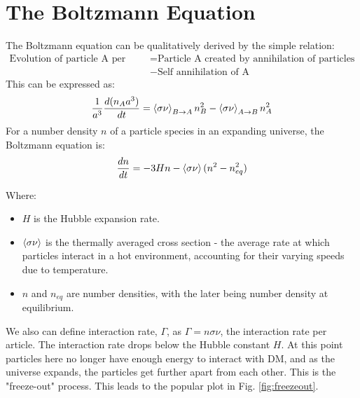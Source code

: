 \documentclass[12pt]{article}
\begin{document}
\section{The Boltzmann Equation}
\label{sec:boltzmann}
The Boltzmann equation can be qualitatively derived by the simple relation:
\begin{equation}
    \begin{split}
            \text{Evolution of particle A per unit volume} &= \text{Particle A created by annihilation of particles in the bath B} 
            \\&- \text{Self annihilation of A}
    \end{split}
\end{equation}
This can be expressed as:
\begin{equation}
    \begin{split}
        \frac{1}{a^3}\frac{d(n_Aa^3)}{dt} = \braket{\sigma \nu}_{B \rightarrow A} n^2_B- \braket{\sigma \nu}_{A \rightarrow B}n^2_A
    \end{split}
\end{equation}
For a number density $n$ of a particle species in an expanding universe, the Boltzmann equation is:
\begin{equation}
    \label{eqn:boltzmann}
    \frac{dn}{dt} = -3Hn - \braket{\sigma\nu}(n^2 - n^2_{eq})
\end{equation}

Where:
\begin{itemize}
    \item $H$ is the Hubble expansion rate.
    \item $\braket{\sigma\nu}$ is the thermally averaged cross section - the average rate at which particles interact in a hot environment, accounting for their varying speeds due to temperature.
    \item $n$ and $n_{eq}$ are number densities, with the later being number density at equilibrium.
\end{itemize}

We also can define interaction rate, $\Gamma$, as $\Gamma = n\sigma\nu$, the interaction rate per article. The interaction rate drops below the Hubble constant $H$. At this point particles here no longer have enough energy to interact with DM, and as the universe expands, the particles get further apart from each other. This is the "freeze-out" process. This leads to the popular plot in Fig. \ref{fig:freezeout}.
\end{document}
